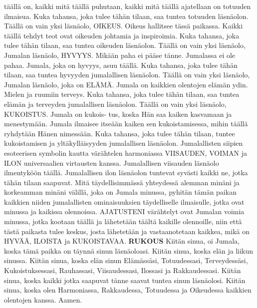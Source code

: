     täällä on, kaikki mitä täällä puhutaan, kaikki mitä
    täällä ajatellaan on totuuden ilmaisua. Kuka tahansa,
    joka tulee tähän tilaan, saa tuntea totuuden läsnäolon.
    \preceparspace
    Täällä on vain yksi läsnäolo, OIKEUS. Oikeus hallitsee
    tässä paikassa. Kaikki täällä tehdyt teot ovat oikeuden
    johtamia ja inspiroimia. Kuka tahansa, joka tulee tähän
    tilaan, saa tuntea oikeuden läsnäolon.
    \preceparspace
    Täällä on vain yksi läsnäolo, Jumalan läsnäolo, HYVYYS.
    Mikään paha ei pääse tänne. Jumalassa ei ole pahaa.
    Jumala, joka on hyvyys, asuu täällä. Kuka tahansa, joka
    tulee tähän tilaan, saa tuntea hyvyyden jumalallisen
    läsnäolon.
    \preceparspace
    Täällä on vain yksi läsnäolo, Jumalan läsnäolo, joka on
    ELÄMÄ. Jumala on kaikkien olentojen elämän ydin.
    Mielen ja ruumiin terveys. Kuka tahansa, joka tulee
    tähän tilaan, saa tuntea elämän ja terveyden jumalallisen
    läsnäolon.
    \preceparspace
    Täällä on vain yksi läsnäolo, KUKOISTUS. Jumala on kukois-
    tus, koska Hän saa kaiken kasvamaan ja menestymään.
    Jumala ilmaisee itseään kaiken sen kukoistamisessa,
    mihin täällä ryhdytään Hänen nimessään. Kuka tahansa,
    joka tulee tähän tilaan, tuntee kukoistamisen ja
    yltäkylläisyyden jumalallisen läsnäolon.
    \preceparspace
    Jumalallisten siipien esoteerisen symbolin kautta
    värähtelen harmoniassa VIISAUDEN, VOIMAN ja ILON
    universaalien virtausten kanssa. Jumalallisen viisauden
    läsnäolo ilmentyköön täällä. Jumalallisen ilon
    läsnäolon tuntevat syvästi kaikki ne, jotka tähän
    tilaan saapuvat.
    \preceparspace
    Mitä täydellisimmässä yhteydessä alemman minäni ja
    korkeamman minäni välillä, joka on Jumala minussa,
    pyhitän tämän paikan kaikkien niiden jumalallisten
    ominaisuuksien täydelliselle ilmaisulle, jotka ovat
    minussa ja kaikissa olennoissa.
    \preceparspace
    AJATUSTENI värähtelyt ovat Jumalan voimia minussa,
    jotka kootaan täällä ja lähetetään täältä kaikille
    olennoille, niin että tästä paikasta tulee keskus,
    josta lähetetään ja vastaanotetaan kaikkea, mikä on
    HYVÄÄ, ILOISTA ja KUKOISTAVAA.
    \preceparspace
    \textbf{RUKOUS}
    \preceparspace
    Kiitän sinua, oi Jumala, koska tämä paikka on täynnä
    sinun läsnäoloasi.
    \preceparspace
    Kiitän sinua, koska elän ja liikun sinussa.
    \preceparspace
    Kiitän sinua, koska elän sinun Elämässäsi, Totuudessasi,
    Terveydessäsi, Kukoistuksessasi, Rauhassasi,
    Viisaudessasi, Ilossasi ja Rakkaudessasi.
    \preceparspace
    Kiitän sinua, koska kaikki jotka saapuvat tänne saavat
    tuntea sinun läsnäolosi.
    \preceparspace
    Kiitän sinua, koska olen Harmoniassa, Rakkaudessa,
    Totuudessa ja Oikeudessa kaikkien olentojen kanssa.
    \preceparspace
    Aamen.
  \endverse
\endsong

